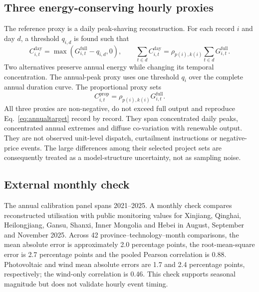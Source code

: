 \documentclass[11pt,a4paper]{article}
\begin{document}
\subsection{Three energy-conserving hourly proxies}

The reference proxy is a daily peak-shaving reconstruction. For each record $i$ and day $d$, a threshold $q_{i,d}$ is found such that
\begin{equation}
C^{\mathrm{day}}_{i,t}=\max\left(G^{\mathrm{full}}_{i,t}-q_{i,d},0\right), \qquad
\sum_{t\in d}C^{\mathrm{day}}_{i,t}=\rho_{p(i),k(i)}\sum_{t\in d}G^{\mathrm{full}}_{i,t}.
\label{eq:dailypeak}
\end{equation}
Two alternatives preserve annual energy while changing its temporal concentration. The annual-peak proxy uses one threshold $q_i$ over the complete annual duration curve. The proportional proxy sets
\begin{equation}
C^{\mathrm{prop}}_{i,t}=\rho_{p(i),k(i)}G^{\mathrm{full}}_{i,t}.
\label{eq:proportional}
\end{equation}
All three proxies are non-negative, do not exceed full output and reproduce Eq.~\ref{eq:annualtarget} record by record. They span concentrated daily peaks, concentrated annual extremes and diffuse co-variation with renewable output. They are not observed unit-level dispatch, curtailment instructions or negative-price events. The large differences among their selected project sets are consequently treated as a model-structure uncertainty, not as sampling noise.

\subsection{External monthly check}

The annual calibration panel spans 2021--2025\cite{renewableannual,renewable2025}. A monthly check compares reconstructed utilisation with public monitoring values for Xinjiang, Qinghai, Heilongjiang, Gansu, Shanxi, Inner Mongolia and Hebei in August, September and November 2025\cite{renewablemonthly}. Across 42 province--technology--month comparisons, the mean absolute error is approximately 2.0 percentage points, the root-mean-square error is 2.7 percentage points and the pooled Pearson correlation is 0.88. Photovoltaic and wind mean absolute errors are 1.7 and 2.4 percentage points, respectively; the wind-only correlation is 0.46. This check supports seasonal magnitude but does not validate hourly event timing.
\end{document}

